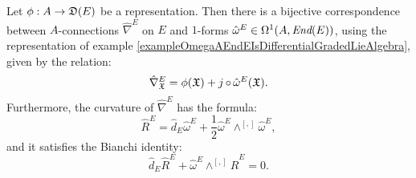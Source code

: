 \begin{theorem}
Let $\phi:A \to \alg D(E)$ be a representation. Then there is a bijective correspondence between $A$-connections $\hat \nabla^E$ on $E$ and $1$-forms $\hat \omega^E \in \Omega^1(A, \operatorname{\textit{End}}(E))$, using the representation of example \ref{exampleOmegaAEndEIsDifferentialGradedLieAlgebra}, given by the relation:
\begin{equation}
    \hat \nabla^E_{\oid X} = \phi(\oid X) + j \comp \hat \omega^E(\oid X).
\end{equation}
Furthermore, the curvature of $\hat \nabla^E$ has the formula:
\begin{equation}
    \hat R^E = \hat d_E \hat \omega^E + \frac{1}{2} \hat \omega^E \wedge^{[,]} \hat \omega^E,
\end{equation}
and it satisfies the Bianchi identity:
\begin{equation}
    \hat d_E \hat R^E + \hat \omega^E \wedge^{[,]} \hat R^E = 0.
\end{equation}
\end{theorem}

